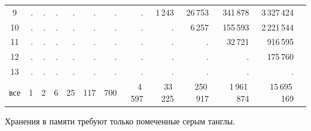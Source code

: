 \documentclass[dvips, intlimits, 9pt, unicode, notheorems, color=usenames,dvipsnames]{beamer}
\theoremstyle{plain}
\theoremstyle{definition}
\begin{document}
\begin{frame}
\begin{table}[ht]
{\begin{tabular}{|c||r|r|r|r|r|r|r|r|r|r|r|r|}
			9   &               . &               . &               . &               . &                . &                 . &                    . &               1\,243 &               26\,753 &              341\,878 &            3\,327\,424 \\
			10  &               . &               . &               . &               . &                . &                 . &                    . &                    . &                6\,257 &              155\,593 &            2\,221\,544 \\
			11  &               . &               . &               . &               . &                . &                 . &                    . &                    . &                     . &               32\,721 &               916\,595 \\
			12  &               . &               . &               . &               . &                . &                 . &                    . &                    . &                     . &                     . &               175\,760 \\
			13  &               . &               . &               . &               . &                . &                 . &                    . &                    . &                     . &                     . &                      . \\
			\hline
			все &               1 &               2 &               6 &              25 &              117 &               700 &               4\,597 &              33\,225 &              250\,917 &           1\,961\,874 &           15\,695\,169 \\
			\hline
			\end{tabular}
		}
		\end{table}

		Хранения в памяти требуют только помеченные серым танглы.
	\end{frame}
\end{document}
